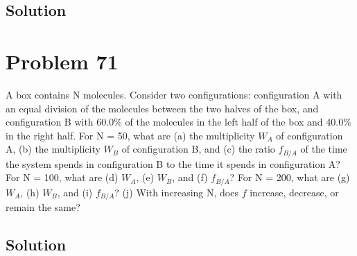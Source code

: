 \documentclass[12pt]{article}
\begin{document}
        \subsection{Solution}

    \section{Problem 71}
        A box contains N molecules. 
        Consider two configurations: configuration A with an equal division of the molecules between the two halves of the box, and configuration B with 60.0\% of the molecules in the left half of the box and 40.0\% in the right half. 
        For N = 50, what are (a) the multiplicity $W_A$ of configuration A, (b) the multiplicity $W_B$ of configuration B, and (c) the ratio $f_{B/A}$ of the time the system spends in configuration B to the time it spends in configuration A? 
        For N = 100, what are (d) $W_A$, (e) $W_B$, and (f) $f_{B/A}$? 
        For N = 200, what are (g) $W_A$, (h) $W_B$, and (i) $f_{B/A}$? 
        (j) With increasing N, does $f$ increase, decrease, or remain the same?

        \subsection{Solution}

    \pagebreak

    \tableofcontents
\end{document}
